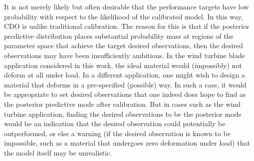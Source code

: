\documentclass[12pt]{article}
\begin{document}
It is not merely likely but often desirable that the performance targets have low probability with respect to the likelihood of the calibrated model. 
%
In this way, CDO is unlike traditional calibration. 
%
The reason for this is that if the posterior predictive distribution places substantial probability mass at regions of the parameter space that achieve the target desired observations, then the desired observations may have been insufficiently ambitious. 
%
In the wind turbine blade application considered in this work, the ideal material would (impossibly) not deform at all under load.
In a different application, one might wish to design a material that deforms in a pre-specified (possible) way. 
In such a case, it would be appropriate to set desired observations that one indeed does hope to find as the posterior predictive mode after calibration. 
%
But in cases such as the wind turbine application, finding the desired observations to be the posterior mode would be an indication that the desired observation could potentially be outperformed, or else a warning (if the desired observation is known to be impossible, such as a material that undergoes zero deformation under load) that the model itself may be unrealistic. 
%

%
\end{document}
